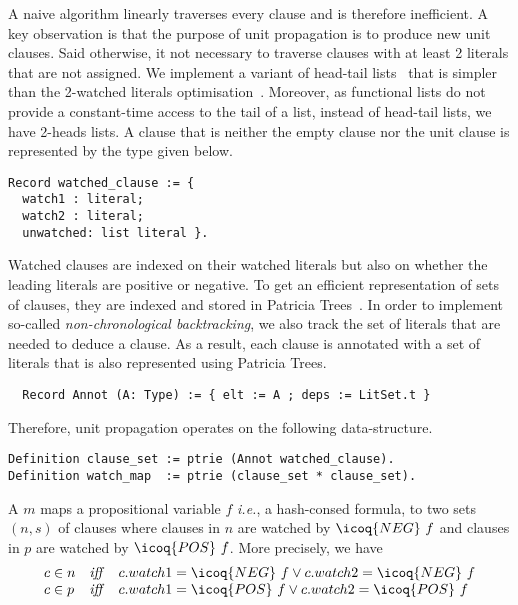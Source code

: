 \documentclass[utf8,a4paper,UKenglish,cleveref, autoref, thm-restate]{lipics-v2019}
\begin{document}
A naive algorithm linearly traverses every clause and is therefore inefficient.
%
A key observation is that the purpose of unit propagation is
to produce new unit clauses. Said otherwise, it not necessary to traverse
clauses with at least 2 literals that are not assigned.
%
We implement a variant of head-tail
lists~\cite{Zhang96anefficient,ZhangS00} that is simpler than the
2-watched literals optimisation~\cite{MoskewiczMZZM01}.
%
Moreover, as functional lists do not provide a constant-time access to the
tail of a list, instead of head-tail lists, we have 2-heads lists.
%
A clause that is neither the empty clause nor the unit clause is
represented by the type  given below.
\begin{verbatim}
Record watched_clause := {
  watch1 : literal;
  watch2 : literal;
  unwatched: list literal }.
\end{verbatim}
Watched clauses are indexed on their watched literals but also on whether the leading literals are positive or negative.
%
To get an efficient representation of sets of clauses, they are indexed and stored in Patricia Trees~\cite{Okasaki98fastmergeable}. 
%
In order to implement so-called \emph{non-chronological backtracking},
we also track the set of literals that are needed to deduce a clause. As a
result, each clause is annotated  with a set of literals  that is also
represented using Patricia Trees.
\begin{verbatim}
  Record Annot (A: Type) := { elt := A ; deps := LitSet.t }
\end{verbatim}
Therefore, unit propagation
operates on the following  data-structure.
\begin{verbatim}
Definition clause_set := ptrie (Annot watched_clause).
Definition watch_map  := ptrie (clause_set * clause_set).
\end{verbatim}
A  $m$ maps a propositional variable $f$ \emph{i.e.},
a hash-consed formula, to two sets $(n,s)$ of clauses where clauses in $n$ are watched by $\icoq{NEG}\ f$ and clauses in $p$ 
are watched  by $\icoq{POS}\ f$. More precisely, we have
\[
  \begin{array}{lcl}
    c \in n &\mathit{ iff }& c.watch1=\icoq{NEG}\ f \lor c.watch2=\icoq{NEG}\ f \\
    c \in p &\mathit{ iff }& c.watch1=\icoq{POS}\ f \lor c.watch2=\icoq{POS}\ f \\
  \end{array}
\]
\end{document}
